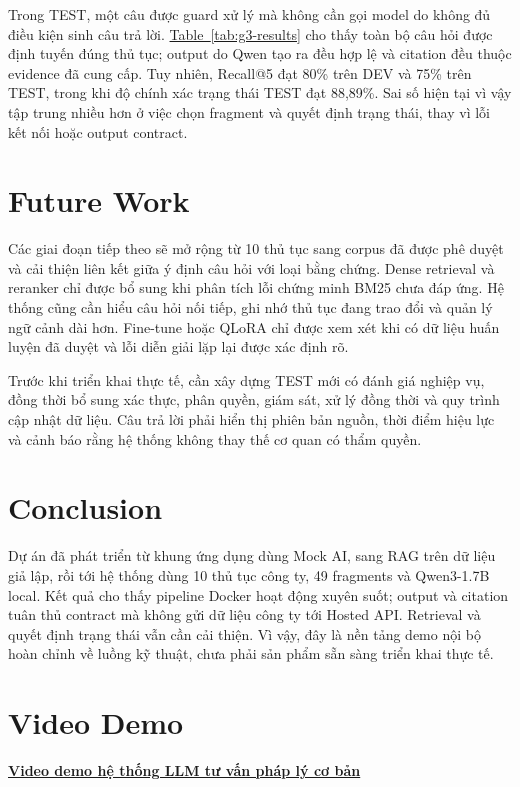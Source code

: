 \documentclass[runningheads]{llncs}
\newcommand{\tableref}[1]{\hyperref[#1]{Table~\ref*{#1}}}
\begin{document}
Trong TEST, một câu được guard xử lý mà không cần gọi model do không đủ điều kiện
sinh câu trả lời. \tableref{tab:g3-results} cho thấy toàn bộ câu hỏi được định
tuyến đúng thủ tục; output do Qwen tạo ra đều hợp lệ và citation đều thuộc
evidence đã cung cấp. Tuy nhiên, Recall@5 đạt 80\% trên DEV và 75\% trên TEST,
trong khi độ chính xác trạng thái TEST đạt 88,89\%. Sai số hiện tại vì vậy tập
trung nhiều hơn ở việc chọn fragment và quyết định trạng thái, thay vì lỗi kết
nối hoặc output contract.

\section{Future Work}

Các giai đoạn tiếp theo sẽ mở rộng từ 10 thủ tục sang corpus đã được phê duyệt và
cải thiện liên kết giữa ý định câu hỏi với loại bằng chứng. Dense retrieval và
reranker chỉ được bổ sung khi phân tích lỗi chứng minh BM25 chưa đáp ứng. Hệ thống
cũng cần hiểu câu hỏi nối tiếp, ghi nhớ thủ tục đang trao đổi và quản lý ngữ cảnh
dài hơn. Fine-tune hoặc QLoRA chỉ được xem xét khi có dữ liệu huấn luyện đã duyệt
và lỗi diễn giải lặp lại được xác định rõ.

Trước khi triển khai thực tế, cần xây dựng TEST mới có đánh giá nghiệp vụ, đồng
thời bổ sung xác thực, phân quyền, giám sát, xử lý đồng thời và quy trình cập nhật
dữ liệu. Câu trả lời phải hiển thị phiên bản nguồn, thời điểm hiệu lực và cảnh báo
rằng hệ thống không thay thế cơ quan có thẩm quyền.

\section{Conclusion}

Dự án đã phát triển từ khung ứng dụng dùng Mock AI, sang RAG trên dữ liệu giả lập,
rồi tới hệ thống dùng 10 thủ tục công ty, 49 fragments và Qwen3-1.7B local. Kết
quả cho thấy pipeline Docker hoạt động xuyên suốt; output và citation tuân thủ
contract mà không gửi dữ liệu công ty tới Hosted API. Retrieval và quyết định
trạng thái vẫn cần cải thiện. Vì vậy, đây là nền tảng demo nội bộ hoàn chỉnh về
luồng kỹ thuật, chưa phải sản phẩm sẵn sàng triển khai thực tế.

\section{Video Demo}

\noindent\href{https://drive.google.com/drive/folders/1iMOLAEUCQz8EJg_uvCxlsPn2mnr5dAB8?usp=sharing}
{\textbf{Video demo hệ thống LLM tư vấn pháp lý cơ bản}}
\end{document}
